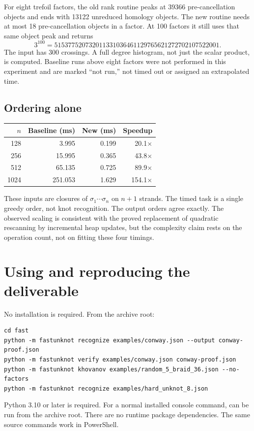 \documentclass[11pt,letterpaper]{article}
\theoremstyle{definition}\newtheorem{definition}[theorem]{Definition}
\theoremstyle{remark}\newtheorem{remark}[theorem]{Remark}
\newcommand{\code}[1]{\texttt{\detokenize{#1}}}
\begin{document}
For eight trefoil factors, the old rank routine peaks at 39366 pre-cancellation
objects and ends with 13122 unreduced homology objects. The new routine needs
at most 18 pre-cancellation objects in a factor. At 100 factors it still uses
that same object peak and returns
\[
 3^{100}=515377520732011331036461129765621272702107522001.
\]
The input has 300 crossings. A full degree histogram, not just the scalar
product, is computed. Baseline runs above eight factors were not performed in
this experiment and are marked ``not run,'' not timed out or assigned an
extrapolated time.

\subsection{Ordering alone}

\begin{center}
\small
\setlength{\tabcolsep}{5pt}
\begin{tabular}{rrrr}
\toprule
$n$ & Baseline (ms) & New (ms) & Speedup\\
\midrule
128 & 3.995 & 0.199 & 20.1$\times$\\
256 & 15.995 & 0.365 & 43.8$\times$\\
512 & 65.135 & 0.725 & 89.9$\times$\\
1024 & 251.053 & 1.629 & 154.1$\times$\\
\bottomrule
\end{tabular}
\end{center}

These inputs are closures of $\sigma_1\cdots\sigma_n$ on $n+1$ strands. The timed
task is a single greedy order, not knot recognition. The output orders agree
exactly. The observed scaling is consistent with the proved replacement of
quadratic rescanning by incremental heap updates, but the complexity claim rests
on the operation count, not on fitting these four timings.

\section{Using and reproducing the deliverable}

No installation is required. From the archive root:
\begin{lstlisting}
cd fast
python -m fastunknot recognize examples/conway.json --output conway-proof.json
python -m fastunknot verify examples/conway.json conway-proof.json
python -m fastunknot khovanov examples/random_5_braid_36.json --no-factors
python -m fastunknot recognize examples/hard_unknot_8.json
\end{lstlisting}
Python 3.10 or later is required. For a normal installed console command,
\code{python -m pip install ./fast} can be run from the archive root. There are no
runtime package dependencies. The same source commands work in PowerShell.
\end{document}
